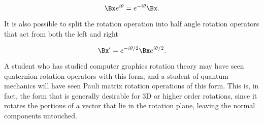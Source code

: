 {\begin{equation}\label{eqn:gradeselectionProblems:440}
\Bx e^{i\theta} = e^{-i\theta} \Bx.
\end{equation}

It is also possible to split the rotation operation into half angle rotation operators that act from both the left and right

\begin{dmath}\label{eqn:gradeselectionProblems:460}
\Bx' = e^{-i\theta/2} \Bx e^{i\theta/2}.
\end{dmath}

A student who has studied computer graphics rotation theory may have seen quaternion rotation operators with this form, and a student of quantum mechanics will have seen Pauli matrix rotation operations of this form.  This is, in fact, the form that is generally desirable for 3D or higher order rotations, since it rotates the portions of a vector that lie in the rotation plane, leaving the normal components untouched.
} %
